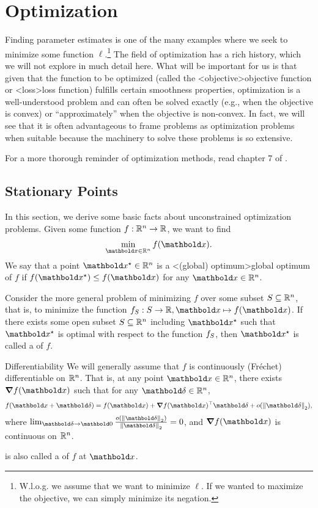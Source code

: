 \section{Optimization}\label{sec:fundamentals:optimization}

Finding parameter estimates is one of the many examples where we seek to minimize some function $\ell$.\footnote{W.l.o.g. we assume that we want to minimize $\ell$. If we wanted to maximize the objective, we can simply minimize its negation.}
The field of optimization has a rich history, which we will not explore in much detail here.
What will be important for us is that given that the function to be optimized (called the \midx<objective>{objective function} or \midx<loss>{loss function}) fulfills certain smoothness properties, optimization is a well-understood problem and can often be solved exactly (e.g., when the objective is convex) or ``approximately'' when the objective is non-convex.
In fact, we will see that it is often advantageous to frame problems as optimization problems when suitable because the machinery to solve these problems is so extensive.

\begin{readings}
  For a more thorough reminder of optimization methods, read chapter 7 of .
\end{readings}

\subsection{Stationary Points}

In this section, we derive some basic facts about unconstrained optimization problems.
Given some function $f : \mathbb{R}^n \to \mathbb{R}$, we want to find \begin{align}
  \min_{\vx \in \R^n} f(\vx).
\end{align}
We say that a point $\vxs \in \R^n$ is a \midx<(global) optimum>{global optimum} of $f$ if $f(\vxs) \leq f(\vx)$ for any $\vx \in \R^n$.

Consider the more general problem of minimizing $f$ over some subset $S \subseteq \mathbb{R}^n$, that is, to minimize the function $f_\sS : \sS \to \R, \vx \mapsto f(\vx)$.
If there exists some open subset $S \subseteq \mathbb{R}^n$ including $\vxs$ such that $\vxs$ is optimal with respect to the function $f_S$, then $\vxs$ is called a  of $f$.

\begin{rmk}{Differentiability}{}
  We will generally assume that $f$ is continuously (Fréchet) differentiable on $\mathbb{R}^n$.
  That is, at any point $\vx \in \R^n$, there exists $\grad f(\vx)$ such that for any $\vdelta \in \R^n$, \begin{align}
    f(\vx + \vdelta) = f(\vx) + \transpose{\grad f(\vx)}\vdelta + o(\norm{\vdelta}_2), \label{eq:first_order_exp}
  \end{align} where $\lim_{\vdelta \to \vzero} \frac{o(\norm{\vdelta}_2)}{\norm{\vdelta}_2} = 0$, and $\grad f(\vx)$ is continuous on $\mathbb{R}^n$.

   is also called a  of $f$ at $\vx$.
\end{rmk}

